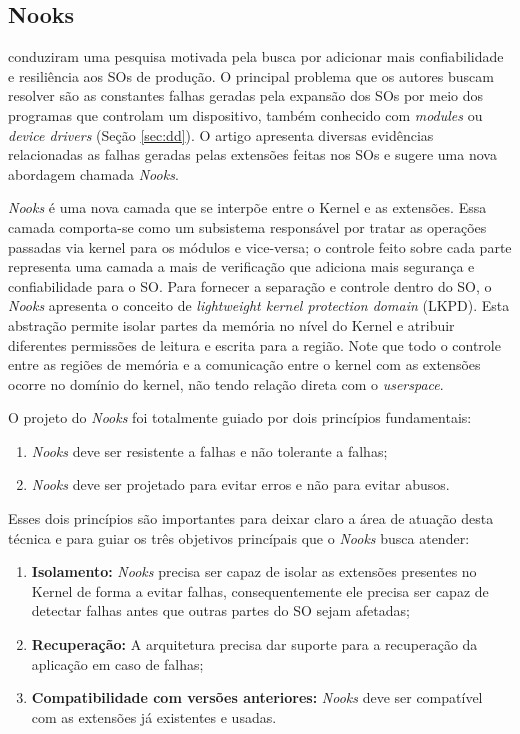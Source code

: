 \subsection{Nooks}
\cite{nooks} conduziram uma pesquisa motivada pela busca por
adicionar mais confiabilidade e resiliência aos SOs de produção. O principal
problema que os autores buscam resolver são as constantes falhas geradas pela
expansão dos SOs por meio dos programas que controlam um dispositivo, também
conhecido com \emph{modules} ou \emph{device drivers} (Seção \ref{sec:dd}). O
artigo apresenta diversas evidências relacionadas as falhas geradas
pelas extensões feitas nos SOs e sugere uma nova abordagem chamada
\emph{Nooks}.

\emph{Nooks} é uma nova camada que se interpõe entre o Kernel e as extensões.
Essa camada comporta-se como um subsistema responsável por tratar as operações
passadas via kernel para os módulos e vice-versa; o controle feito sobre cada
parte representa uma camada a mais de verificação que adiciona mais segurança e
confiabilidade para o SO. Para fornecer a separação e controle dentro do SO, o
\emph{Nooks} apresenta o conceito de \emph{lightweight kernel protection
domain} (LKPD). Esta abstração permite isolar partes da memória no nível do
Kernel e atribuir diferentes permissões de leitura e escrita para a região.
Note que todo o controle entre as regiões de memória e a comunicação entre o
kernel com as extensões ocorre no domínio do kernel, não tendo relação direta
com o \emph{userspace}.

O projeto do \emph{Nooks} foi totalmente guiado por dois princípios
fundamentais:
\begin{enumerate}
	\item \emph{Nooks} deve ser resistente a falhas e não tolerante a falhas;
	\item \emph{Nooks} deve ser projetado para evitar erros e não para evitar
				abusos.
\end{enumerate}
Esses dois princípios são importantes para deixar claro a área de atuação desta
técnica e para guiar os três objetivos princípais que o \emph{Nooks} busca
atender:
\begin{enumerate}
	\item \textbf{Isolamento:} \emph{Nooks} precisa ser capaz de isolar as
				extensões presentes no Kernel de forma a evitar falhas, consequentemente
				ele precisa ser capaz de detectar falhas antes que outras partes do
				SO sejam afetadas;
	\item \textbf{Recuperação:} A arquitetura precisa dar suporte para a
				recuperação da aplicação em caso de falhas;
	\item \textbf{Compatibilidade com versões anteriores:} \emph{Nooks} deve ser
				compatível com as extensões já existentes e usadas.
\end{enumerate}

